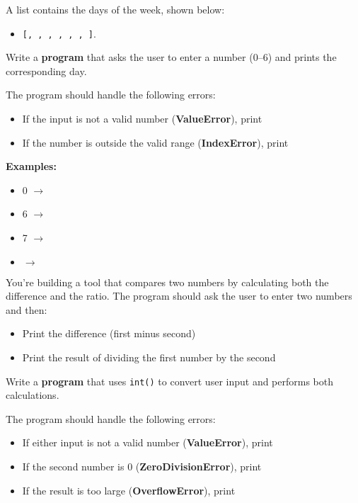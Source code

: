 		A list contains the days of the week, shown below: 
		\begin{itemize}
			\item \texttt{[, , , , 
				, , ]}.  
		\end{itemize}
		Write a \textbf{program} that asks the user to enter a number (0--6) and prints the 
		corresponding day.

		The program should handle the following errors:
		\begin{itemize}
			\item If the input is not a valid number (\textbf{ValueError}), 
				print 
			\item If the number is outside the valid range (\textbf{IndexError}), 
				print 
		\end{itemize}

		\textbf{Examples:}
		\begin{itemize}
			\item {} 0 $\rightarrow$ 
			\item {} 6 $\rightarrow$ 
			\item {} 7 $\rightarrow$ 
			\item {}  $\rightarrow$ 
		\end{itemize}



	\item 
		You're building a tool that compares two numbers by calculating both the difference 
		and the ratio. The program should ask the user to enter two numbers and then:
		\begin{itemize}
			\item Print the difference (first minus second)
			\item Print the result of dividing the first number by the second
		\end{itemize}

		Write a \textbf{program} that uses \texttt{int()} to convert user input and 
		performs both calculations.  

		The program should handle the following errors:
		\begin{itemize}
			\item If either input is not a valid number (\textbf{ValueError}), 
				print 
			\item If the second number is 0 (\textbf{ZeroDivisionError}), 
				print 
			\item If the result is too large (\textbf{OverflowError}), 
				print 
		\end{itemize}

